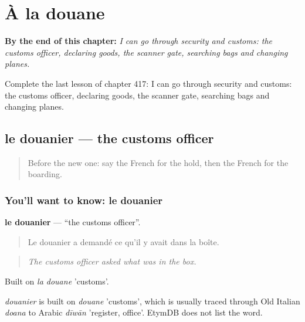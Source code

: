 
\chapter{À la douane}
\label{ch:fr-a-la-douane}

\begin{chapteropening}
\textbf{By the end of this chapter:} \emph{I can go through security and customs: the customs officer, declaring goods, the scanner gate, searching bags and changing planes.}

Complete the last lesson of chapter 417: I can go through security and customs: the customs officer, declaring goods, the scanner gate, searching bags and changing planes.
\end{chapteropening}

\section[le douanier]{le douanier — the customs officer}

\label{lesson:FR-C417-douanier}



\begin{quote}
Before the new one: say the French for the hold, then the French for the boarding.
\end{quote}

\subsection*{You'll want to know: le douanier}
\textbf{le douanier} — \textquotedblleft{}the customs officer\textquotedblright{}.

\begin{quote}
Le douanier a demandé ce qu'il y avait dans la boîte.
\end{quote}

\begin{quote}
\emph{The customs officer asked what was in the box.}
\end{quote}

Built on \emph{la douane} 'customs'.

\begin{cousinweb}
\emph{douanier} is built on \emph{douane} 'customs', which is usually traced through Old Italian \emph{doana} to Arabic \emph{dīwān} 'register, office'. EtymDB does not list the word.
\end{cousinweb}


